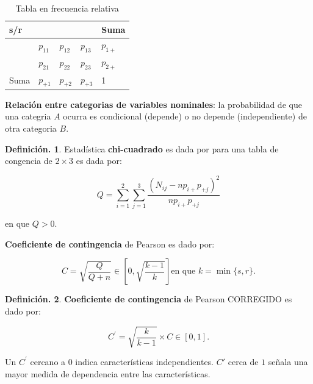 \documentclass[]{book}
\theoremstyle{definition}
\newtheorem{definition}{Definición.}[chapter]
\theoremstyle{definition}
\theoremstyle{definition}
\theoremstyle{remark}
\begin{document}
\begin{table}[!htbp]
\centering
\caption{Tabla en frecuencia relativa}
\label{m}
\begin{tabular}{|l|l|l|l|l|}
\hline
  s/r&                 &  &  & \mbox{Suma}  \\ \hline
   &        $p_{11}$ & $p_{12}$  & $p_{13}$  &  $p_{1+}$ \\ \hline
 &        $p_{21}$ & $p_{22}$  & $p_{23}$  & $p_{2+}$  \\ \hline
\mbox{Suma} & $p_{+1}$ & $p_{+2}$    & $p_{+3}$  & 1  \\ \hline
\end{tabular}
\end{table}

\textbf{Relación entre categorias de variables nominales}: la probabilidad de que una categria \(A\) ocurra es condicional (depende) o no depende (independiente) de otra categoria \(B\).

\begin{definition}
\protect\hypertarget{def:unnamed-chunk-82}{}{\label{def:unnamed-chunk-82} }Estadística \textbf{chi-cuadrado} es dada por para una tabla de congencia de
\(2\times 3\) es dada por:

\begin{equation*}
 Q= \sum_{i=1}^2 \sum_{j=1}^3 \frac{(N_{ij} - np_{i+}p_{+j})^2
  }{np_{i+}p_{+j} }
\end{equation*}

en que \(Q>0\).

\textbf{Coeficiente de contingencia} de Pearson es dado por:

\begin{equation*}
C= \sqrt{  \frac{Q}{Q+n}}  \in \left[0, \sqrt{\frac{k-1}{k}} \right]
\mbox{en que } k = \min \{s,r \} .
\end{equation*}
\end{definition}

\begin{definition}
\protect\hypertarget{def:unnamed-chunk-83}{}{\label{def:unnamed-chunk-83} }
\textbf{Coeficiente de contingencia} de Pearson CORREGIDO es dado por:

\begin{equation*}
C^{\prime}= \sqrt{\frac{k}{k-1}}\times C \in [0,1].
\end{equation*}

Un \(C^{'}\) cercano a \(0\) indica características independientes. \(C'\)
cerca de \(1\) señala una mayor medida de dependencia entre las
características.
\end{definition}
\end{document}
